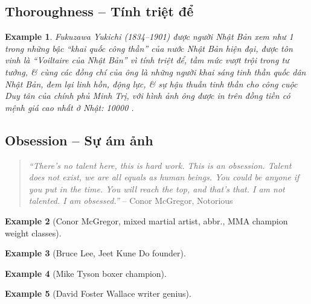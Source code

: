 \documentclass[12pt,oneside]{book}
\newtheorem{example}{Example}
\begin{document}
\subsection{Thoroughness -- Tính triệt để}

\begin{example}
	{\sc Fukuzawa Yukichi} (1834--1901) được người Nhật Bản xem như 1 trong những bậc ``khai quốc công thần'' của nước Nhật Bản hiện đại, được tôn vinh là ``Voiltaire của Nhật Bản'' vì tính triệt để, tầm mức vượt trội trong tư tưởng, \& cùng các đồng chí của ông là những người khai sáng tinh thần quốc dân Nhật Bản, đem lại linh hồn, động lực, \& sự hậu thuẫn tinh thần cho công cuộc Duy tân của chính phủ Minh Trị, với hình ảnh ông được in trên đồng tiền có mệnh giá cao nhất ở Nhật: {\rm10000 \textyen}  {\rm\cite{Yukichi_encourage_learn,Yukichi_khuyen_hoc}}.
\end{example}

\subsection{Obsession -- Sự ám ảnh}

\begin{quotation}
	{\it``There's no talent here, this is hard work. This is an obsession. Talent does not exist, we are all equals as human beings. You could be anyone if you put in the time. You will reach the top, and that's that. I am not talented. I am obsessed.''} -- {\sc Conor McGregor}, Notorious
\end{quotation}

\begin{example}[{\sc Conor McGregor}, mixed martial artist, abbr., MMA champion weight classes]
	
\end{example}

\begin{example}[{\sc Bruce Lee}, Jeet Kune Do founder]
	
\end{example}

\begin{example}[{\sc Mike Tyson} boxer champion]
	
\end{example}

\begin{example}[{\sc David Foster Wallace} writer genius]
	
\end{example}
\end{document}
